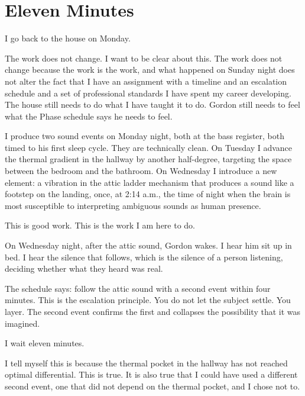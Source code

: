 
\chapter{Eleven Minutes}

I go back to the house on Monday.

The work does not change. I want to be clear about this. The work does not change because the work is the work, and what happened on Sunday night does not alter the fact that I have an assignment with a timeline and an escalation schedule and a set of professional standards I have spent my career developing. The house still needs to do what I have taught it to do. Gordon still needs to feel what the Phase schedule says he needs to feel.

I produce two sound events on Monday night, both at the bass register, both timed to his first sleep cycle. They are technically clean. On Tuesday I advance the thermal gradient in the hallway by another half-degree, targeting the space between the bedroom and the bathroom. On Wednesday I introduce a new element: a vibration in the attic ladder mechanism that produces a sound like a footstep on the landing, once, at 2:14 a.m., the time of night when the brain is most susceptible to interpreting ambiguous sounds as human presence.

This is good work. This is the work I am here to do.

On Wednesday night, after the attic sound, Gordon wakes. I hear him sit up in bed. I hear the silence that follows, which is the silence of a person listening, deciding whether what they heard was real.

The schedule says: follow the attic sound with a second event within four minutes. This is the escalation principle. You do not let the subject settle. You layer. The second event confirms the first and collapses the possibility that it was imagined.

I wait eleven minutes.

I tell myself this is because the thermal pocket in the hallway has not reached optimal differential. This is true. It is also true that I could have used a different second event, one that did not depend on the thermal pocket, and I chose not to.

